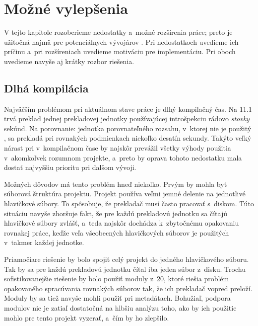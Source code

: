 \section{Možné vylepšenia} \label{vylepsenia}

V tejto kapitole rozoberieme nedostatky a~možné rozšírenia práce; preto je užitočná najmä pre potenciálnych vývojárov \PPreflection{}. Pri nedostatkoch uvedieme ich príčinu a~pri rozšíreniach uvedieme motiváciu pre implementáciu. Pri oboch uvedieme navyše aj krátky rozbor riešenia.

\subsection{Dlhá kompilácia}

Najväčším problémom pri aktuálnom stave práce je dlhý kompilačný čas. Na \GCC{} 11.1 trvá preklad jednej prekladovej jednotky používajúcej introšpekciu rádovo \emph{stovky} sekúnd. Na porovnanie: jednotka porovnateľného rozsahu, v~ktorej nie je použitý \PPreflection{}, sa prekladá pri rovnakých podmienkach niekoľko desatín sekundy. Takýto veľký nárast pri v~kompilačnom čase by najskôr prevážil všetky výhody použitia \PPreflection{} v~akomkoľvek rozumnom projekte, a~preto by oprava tohoto nedostatku mala dostať najvyššiu prioritu pri ďalšom vývoji.

Možných dôvodov má tento problém hneď niekoľko. Prvým by mohla byť súborová štruktúra projektu. Projekt používa veľmi jemné delenie na jednotlivé hlavičkové súbory. To spôsobuje, že prekladač musí často pracovať s~diskom. Túto situáciu navyše zhoršuje fakt, že pre každú prekladovú jednotku sa čítajú hlavičkové súbory zvlášť, a~teda najskôr dochádza k~zbytočnému opakovaniu rovnakej práce, keďže veľa všeobecných hlavičkových súborov je použitých v~takmer každej jednotke.

Priamočiare riešenie by bolo spojiť celý projekt do jedného hlavičkového súboru. Tak by sa pre každú prekladovú jednotku čítal iba jeden súbor z~disku. Trochu sofistikovanejšie riešenie by bolo použiť moduly z~\Cpp{}20, ktoré riešia problém opakovaného spracúvania rovnakých súborov tak, že ich prekladač vopred preloží. Moduly by sa tiež navyše mohli použiť pri metadátach. Bohužiaľ, podpora modulov nie je zatiaľ dostatočná na hlbšiu analýzu toho, ako by ich použitie mohlo pre tento projekt vyzerať, a~čím by ho zlepšilo.


